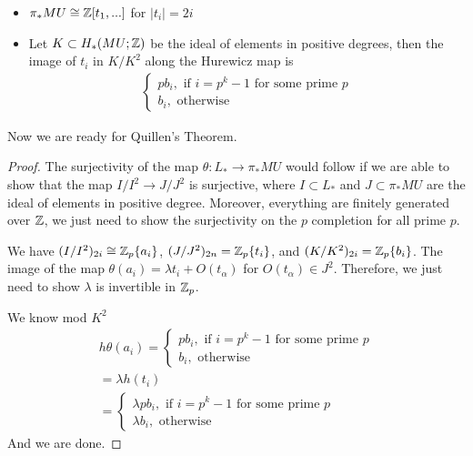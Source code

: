 \begin{theorem}
    \cite{ChrMilnorCobordism}\cite{ChrNovikov2} \cite{ChrNovikov3}
    \begin{itemize}
        \item $\pi_*MU\cong \mathbb{Z}[t_1,...]$ for $|t_i|=2i$
        \item Let $K\subset H_*(MU;\mathbb{Z})$ be the ideal of elements in positive degrees, then the image of $t_i$ in $K/K^2$ along the Hurewicz map is
\begin{align*}
     \begin{cases}
            pb_i, \text{ if $i=p^k-1$ for some prime $p$}
            \\ b_i, \text{ otherwise}
        \end{cases}
\end{align*}
    \end{itemize}
\end{theorem}

Now we are ready for Quillen's Theorem.
\begin{proof}
    The surjectivity of the map $\theta: L_*\to \pi_*MU$ would follow if we are able to show that the map $I/I^2\to J/J^2$ is surjective, where $I\subset L_*$ and $J\subset \pi_*MU$ are the ideal of elements in positive degree. Moreover, everything are finitely generated over $\mathbb{Z}$, we just need to show the surjectivity on the $p$ completion for all prime $p$.

    We have $(I/I^2)_{2i}\cong \mathbb{Z}_p\{a_i\}$, $(J/J^2)_{2n}=\mathbb{Z}_p\{t_i\}$, and $(K/K^2)_{2i}= \mathbb{Z}_p\{b_i\}$. The image of the map $\theta(a_i)= \lambda t_i +O(t_\alpha)$ for $O(t_\alpha)\in J^2$. Therefore, we just need to show $\lambda$ is invertible in $\mathbb{Z}_p$.  

    We know mod $K^2$
    \begin{align*}
     h\theta(a_i)=
            \begin{cases}
            pb_i, \text{ if $i=p^k-1$ for some prime $p$}
            \\ b_i, \text{ otherwise}
        \end{cases}
       \\ =  \lambda h(t_i)
       \\=  \begin{cases}
            \lambda pb_i, \text{ if $i=p^k-1$ for some prime $p$}
            \\ \lambda b_i, \text{ otherwise}
        \end{cases}
    \end{align*}And we are done.
\end{proof}


